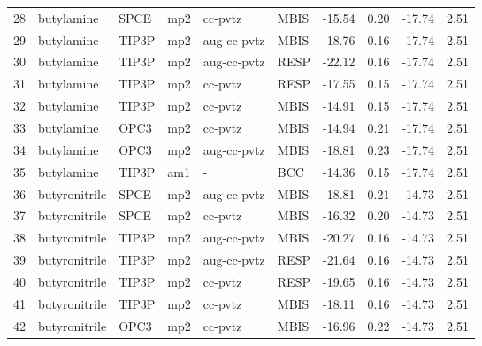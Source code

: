 \begin{tabular}{llllllrrrr}
28  &                     butylamine &       SPCE &      mp2 &      cc-pvtz &         MBIS & -15.54 &      0.20 &      -17.74 &     2.51 \\
29  &                     butylamine &      TIP3P &      mp2 &  aug-cc-pvtz &         MBIS & -18.76 &      0.16 &      -17.74 &     2.51 \\
30  &                     butylamine &      TIP3P &      mp2 &  aug-cc-pvtz &         RESP & -22.12 &      0.16 &      -17.74 &     2.51 \\
31  &                     butylamine &      TIP3P &      mp2 &      cc-pvtz &         RESP & -17.55 &      0.15 &      -17.74 &     2.51 \\
32  &                     butylamine &      TIP3P &      mp2 &      cc-pvtz &         MBIS & -14.91 &      0.15 &      -17.74 &     2.51 \\
33  &                     butylamine &       OPC3 &      mp2 &      cc-pvtz &         MBIS & -14.94 &      0.21 &      -17.74 &     2.51 \\
34  &                     butylamine &       OPC3 &      mp2 &  aug-cc-pvtz &         MBIS & -18.81 &      0.23 &      -17.74 &     2.51 \\
35  &                     butylamine &      TIP3P &      am1 &            - &          BCC & -14.36 &      0.15 &      -17.74 &     2.51 \\
36  &                  butyronitrile &       SPCE &      mp2 &  aug-cc-pvtz &         MBIS & -18.81 &      0.21 &      -14.73 &     2.51 \\
37  &                  butyronitrile &       SPCE &      mp2 &      cc-pvtz &         MBIS & -16.32 &      0.20 &      -14.73 &     2.51 \\
38  &                  butyronitrile &      TIP3P &      mp2 &  aug-cc-pvtz &         MBIS & -20.27 &      0.16 &      -14.73 &     2.51 \\
39  &                  butyronitrile &      TIP3P &      mp2 &  aug-cc-pvtz &         RESP & -21.64 &      0.16 &      -14.73 &     2.51 \\
40  &                  butyronitrile &      TIP3P &      mp2 &      cc-pvtz &         RESP & -19.65 &      0.16 &      -14.73 &     2.51 \\
41  &                  butyronitrile &      TIP3P &      mp2 &      cc-pvtz &         MBIS & -18.11 &      0.16 &      -14.73 &     2.51 \\
42  &                  butyronitrile &       OPC3 &      mp2 &      cc-pvtz &         MBIS & -16.96 &      0.22 &      -14.73 &     2.51 \\

\end{tabular}
